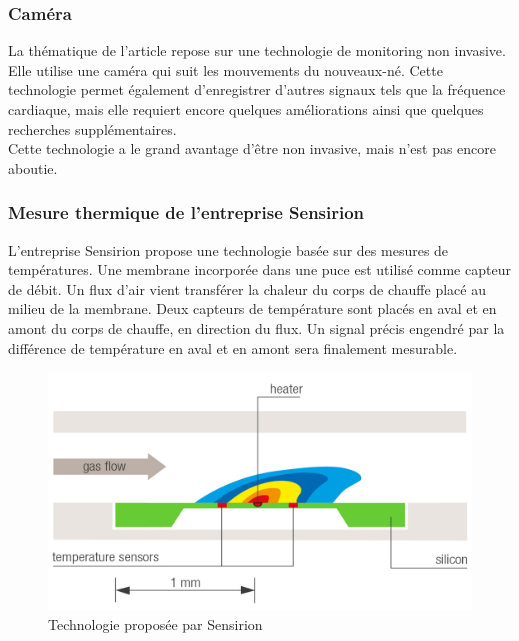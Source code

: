 \subsubsection{Caméra}
La thématique de l'article \cite{villarroel_non-contact_2019} repose sur une technologie de monitoring non invasive. Elle utilise une caméra qui suit les mouvements du nouveaux-né. 
Cette technologie permet également d'enregistrer d'autres signaux tels que la fréquence cardiaque, mais elle requiert encore quelques améliorations 
ainsi que quelques recherches supplémentaires. \\

Cette technologie a le grand avantage d'être non invasive, mais n'est pas encore aboutie. 

\subsubsection{Mesure thermique de l'entreprise Sensirion}
L'entreprise Sensirion propose une technologie basée sur des mesures de températures. Une membrane incorporée dans une puce est utilisé comme 
capteur de débit. Un flux d'air vient transférer la chaleur du corps de chauffe placé au milieu de la membrane. Deux capteurs de température 
sont placés en aval et en amont du corps de chauffe, en direction du flux. Un signal précis engendré par la différence de température en aval et  
en amont sera finalement mesurable. 
\begin{figure}[H]
    \centering
    \includegraphics[scale = 0.1]{assets/figures/Sensirion_tech.png}
    \caption{Technologie proposée par Sensirion\cite{noauthor_smart_nodate}}
    \label{fig:sensirion}
\end{figure}

